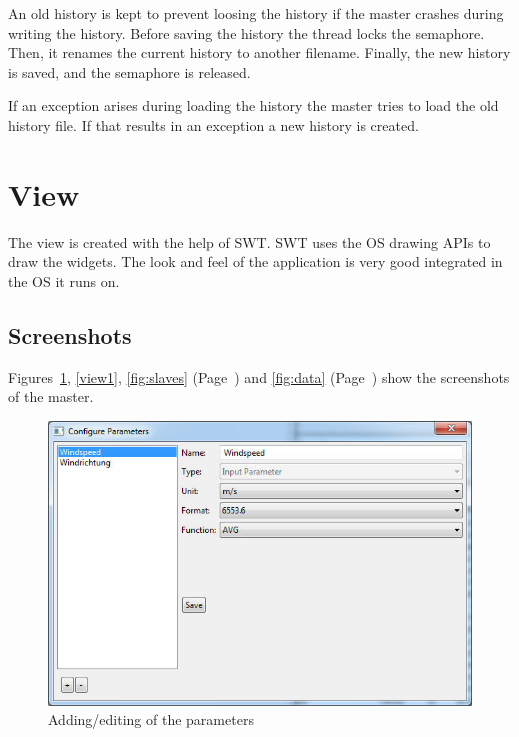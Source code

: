 An old history is kept to prevent loosing the history if the master crashes during writing the history. Before saving the history the thread locks the semaphore. Then, it renames the current history to another filename. Finally, the new history is saved, and the semaphore is released.

If an exception arises during loading the history the master tries to load the old history file. If that results in an exception a new history is created.

\section{View} %
\label{sec:view}

The view is created with the help of SWT. SWT uses the OS drawing APIs to draw the widgets. The look and feel of the application is very good integrated in the OS it runs on. 

\subsection{Screenshots} %
\label{sub:screenshots}
Figures~\ref{fig:parameter}, \ref{view1}, \ref{fig:slaves} (Page~\pageref{fig:slaves}) and \ref{fig:data} (Page~\pageref{fig:data}) show the screenshots of the master.

\begin{figure}[ht]
    \centering
    \includegraphics[width=\linewidth]{master/parameters.jpg}
    \caption{Adding/editing of the parameters}
    \label{fig:parameter}
\end{figure} 


